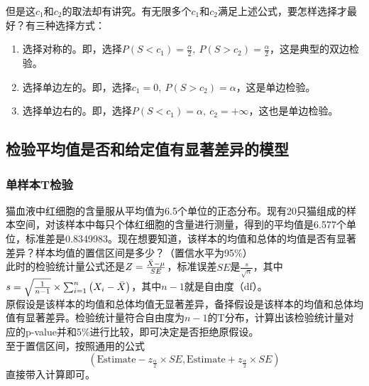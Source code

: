 \documentclass{MGLSA-cn-book-math}
\begin{document}
但是这$c_1$和$c_2$的取法却有讲究。有无限多个$c_1$和$c_2$满足上述公式，要怎样选择才最好？有三种选择方式：

\begin{enumerate}
  \item 选择对称的。即，选择$P(S<c_1)=\frac{\alpha}{2},\ P(S>c_2)=\frac{\alpha}{2}$，这是典型的双边检验。
  \item 选择单边左的。即，选择$c_1=0,\ P(S>c_2)=\alpha$，这是单边检验。
  \item 选择单边右的。即，选择$P(S<c_1)=\alpha,\ c_2=+\infty$，这也是单边检验。
\end{enumerate}

\subsection{检验平均值是否和给定值有显著差异的模型}
\subsubsection{单样本T检验}
猫血液中红细胞的含量服从平均值为6.5个单位的正态分布。现有20只猫组成的样本空间，对该样本中每只个体红细胞的含量进行测量，得到的平均值是6.577个单位，标准差是0.8349983。现在想要知道，该样本的均值和总体的均值是否有显著差异？样本均值的置信区间是多少？（置信水平为95\%）\\
\indent 此时的检验统计量公式还是$Z=\frac{\Bar{X}-\mu}{SE}$，标准误差$SE$是$\frac{s}{\sqrt{n}}$，其中$s=\sqrt{\frac{1}{n-1}}\times \sum_{i=1}^n\left(X_i-\Bar{X}\right)$，其中$n-1$就是自由度（df）。\\
\indent 原假设是该样本的均值和总体均值无显著差异，备择假设是该样本的均值和总体均值有显著差异。检验统计量符合自由度为$n-1$的T分布，计算出该检验统计量对应的p-value并和5\%进行比较，即可决定是否拒绝原假设。\\
\indent 至于置信区间，按照通用的公式
\[
\left(\text{Estimate}-z_{\frac{\alpha}{2}}\times SE,\text{Estimate}+z_{\frac{\alpha}{2}}\times SE\right)
\]
直接带入计算即可。
\end{document}
